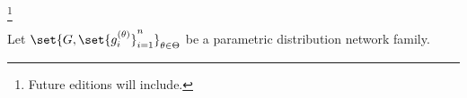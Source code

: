 
\footnote{Future editions will include.}


Let $\set{G, \set{g_i^{(\theta)}}_{i=1}^{n}}_{\theta \in \Theta}$ be a parametric distribution network family.



\blankpage
